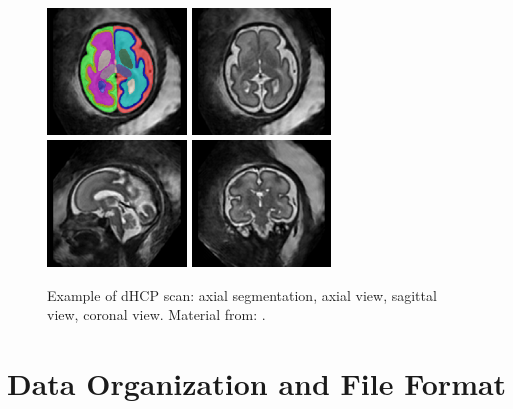 \begin{figure}[htbp]
    \centering
    \includegraphics[width=0.33\textwidth]{figures/dhcp_ax_dseg.png}
    \hspace{5pt}
    \includegraphics[width=0.33\textwidth]{figures/dhcp_ax.png} \\
    \vspace{10pt}
    \includegraphics[width=0.33\textwidth]{figures/dhcp_sag.png}
    \hspace{5pt}
    \includegraphics[width=0.33\textwidth]{figures/dhcp_cor.png}
    \caption{Example of dHCP scan: axial segmentation, axial view, sagittal view, coronal view. Material from: \cite{dHCP}.}
    \label{fig:dhcp_images}
\end{figure}

\section{Data Organization and File Format}

